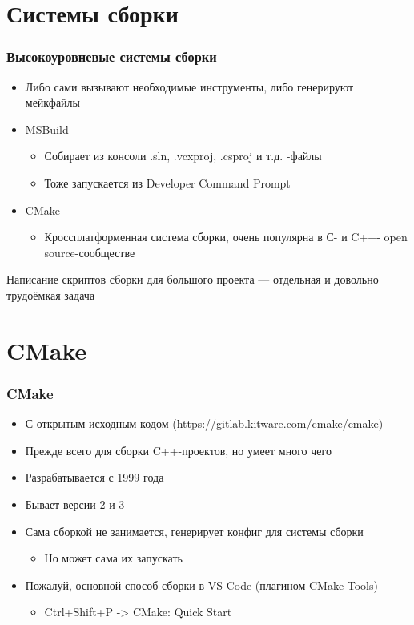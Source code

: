 \documentclass{../../slides-style}
\begin{document}
    \section{Системы сборки}

    \begin{frame}
        \frametitle{Высокоуровневые системы сборки}
        \begin{itemize}
            \item Либо сами вызывают необходимые инструменты, либо генерируют мейкфайлы
            \item MSBuild
            \begin{itemize}
                \item Собирает из консоли .sln, .vcxproj, .csproj и т.д. -файлы
                \item Тоже запускается из Developer Command Prompt
            \end{itemize}
            \item CMake
            \begin{itemize}
                \item Кроссплатформенная система сборки, очень популярна в С- и C++- open source-сообществе
            \end{itemize}
        \end{itemize}
        Написание скриптов сборки для большого проекта --- отдельная и довольно трудоёмкая задача
    \end{frame}

    \section{CMake}

    \begin{frame}
        \frametitle{CMake}
        \begin{itemize}
            \item С открытым исходным кодом (\url{https://gitlab.kitware.com/cmake/cmake})
            \item Прежде всего для сборки C++-проектов, но умеет много чего
            \item Разрабатывается с 1999 года
            \item Бывает версии 2 и 3
            \item Сама сборкой не занимается, генерирует конфиг для системы сборки
            \begin{itemize}
                \item Но может сама их запускать
            \end{itemize}
            \item Пожалуй, основной способ сборки в VS Code (плагином CMake Tools)
            \begin{itemize}
                \item Ctrl+Shift+P -> CMake: Quick Start
            \end{itemize}
        \end{itemize}
    \end{frame}
\end{document}
